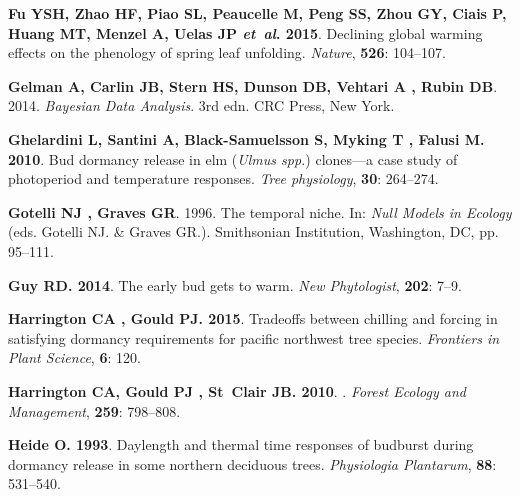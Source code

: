 \documentclass[11pt]{article}
\begin{document}
\begin{thebibliography}{69}
{\bf Fu YSH, Zhao HF, Piao SL, Peaucelle M, Peng SS, Zhou GY, Ciais P, Huang
  MT, Menzel A, Uelas JP \emph{et~al}}{\bf . 2015}.
\newblock Declining global warming effects on the phenology of spring leaf
  unfolding.
\newblock \emph{Nature}, {\bf 526}: 104--107.

{\bf Gelman A, Carlin JB, Stern HS, Dunson DB, Vehtari A , Rubin DB}. 2014.
\newblock \emph{Bayesian Data Analysis}.
\newblock 3rd edn.
\newblock CRC Press, New York.

{\bf Ghelardini L, Santini A, Black-Samuelsson S, Myking T , Falusi M}{\bf .
  2010}.
\newblock Bud dormancy release in elm (\textit{{U}lmus spp.}) clones---a case
  study of photoperiod and temperature responses.
\newblock \emph{Tree physiology}, {\bf 30}: 264--274.

{\bf Gotelli NJ , Graves GR}. 1996.
\newblock The temporal niche.
\newblock In: \emph{Null Models in Ecology} (eds. Gotelli NJ. \& Graves GR.).
\newblock Smithsonian Institution, Washington, DC, pp. 95--111.

{\bf Guy RD}{\bf . 2014}.
\newblock The early bud gets to warm.
\newblock \emph{New Phytologist}, {\bf 202}: 7--9.

{\bf Harrington CA , Gould PJ}{\bf . 2015}.
\newblock Tradeoffs between chilling and forcing in satisfying dormancy
  requirements for pacific northwest tree species.
\newblock \emph{Frontiers in Plant Science}, {\bf 6}: 120.

{\bf Harrington CA, Gould PJ , St~Clair JB}{\bf . 2010}.
.
\newblock \emph{Forest Ecology and Management}, {\bf 259}: 798--808.

{\bf Heide O}{\bf . 1993{}}.
\newblock Daylength and thermal time responses of budburst during dormancy
  release in some northern deciduous trees.
\newblock \emph{Physiologia Plantarum}, {\bf 88}: 531--540.


\end{thebibliography}
\end{document}
